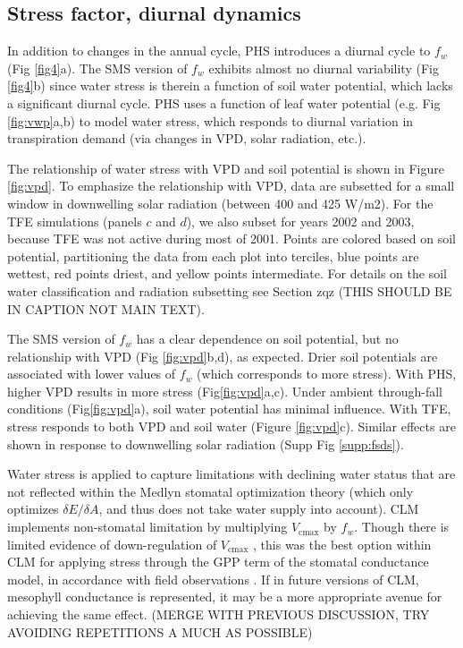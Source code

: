 \documentclass[draft,linenumbers]{agujournal}
\begin{document}
\subsection{Stress factor, diurnal dynamics}
    
    In addition to changes in the annual cycle, PHS introduces a diurnal cycle to $f_w$ (Fig \ref{fig4}a).  The SMS version of $f_w$ exhibits almost no diurnal variability (Fig \ref{fig4}b) since  water stress is therein a function of soil water potential, which lacks a significant diurnal cycle. PHS uses a function of leaf water potential (e.g. Fig \ref{fig:vwp}a,b) to model water stress, which responds to diurnal variation in transpiration demand (via changes in VPD, solar radiation, etc.).
    
    The relationship of water stress with VPD and soil potential is shown in Figure \ref{fig:vpd}. To emphasize the relationship with VPD, data are subsetted for a small window in downwelling solar radiation (between 400 and 425 W/m2). For the TFE simulations (panels $c$ and $d$), we also subset for years 2002 and 2003, because TFE was not active during most of 2001. Points are colored based on soil potential, partitioning the data from each plot into terciles, blue points are wettest, red points driest, and yellow points intermediate. For details on the soil water classification and radiation subsetting see Section zqz (THIS SHOULD BE IN CAPTION NOT MAIN TEXT).
    
    The SMS version of $f_w$ has a clear dependence on soil potential, but no relationship with VPD (Fig \ref{fig:vpd}b,d), as expected. Drier soil potentials are associated with lower values of $f_w$ (which corresponds to more stress). With PHS, higher VPD results in more stress (Fig\ref{fig:vpd}a,c). Under ambient through-fall conditions (Fig\ref{fig:vpd}a), soil water potential has minimal influence. With TFE, stress responds to both VPD and soil water (Figure \ref{fig:vpd}c). Similar effects are shown in response to downwelling solar radiation (Supp Fig \ref{supp:fsds}).
    
    Water stress is applied to capture limitations with declining water status that are not reflected within the Medlyn stomatal optimization theory (which only optimizes $\delta E / \delta A$, and thus does not take water supply into account). CLM implements non-stomatal limitation by multiplying $V_{\text{cmax}}$ by $f_w$. Though there is limited evidence of down-regulation of $V_{\text{cmax}}$ \citep{flexas2006}, this was the best option within CLM  for applying stress through the GPP term of the stomatal conductance model, in accordance with field observations \citep{lin2018,zhou2013}.
    If in future versions of CLM, mesophyll conductance is represented, it may be a more appropriate avenue for achieving the same effect. (MERGE WITH PREVIOUS DISCUSSION, TRY AVOIDING REPETITIONS A MUCH AS POSSIBLE)
    
\end{document}
